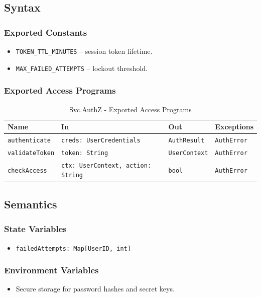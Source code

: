 \documentclass[12pt, titlepage]{article}
\begin{document}
\subsection{Syntax}

\subsubsection{Exported Constants}
\begin{itemize}
    \item \texttt{TOKEN\_TTL\_MINUTES} – session token lifetime.
    \item \texttt{MAX\_FAILED\_ATTEMPTS} – lockout threshold.
\end{itemize}

\subsubsection{Exported Access Programs}

\begin{table}[H]
\centering
\small
\caption{Svc.AuthZ - Exported Access Programs}
\begin{tabular}{p{3.2cm} p{3.8cm} p{3cm} p{4cm}}
\toprule
\textbf{Name} & \textbf{In} & \textbf{Out} & \textbf{Exceptions} \\
\midrule
\texttt{authenticate} & \texttt{creds: UserCredentials} & \texttt{AuthResult} & \texttt{AuthError} \\
\texttt{validateToken} & \texttt{token: String} & \texttt{UserContext} & \texttt{AuthError} \\
\texttt{checkAccess} & \texttt{ctx: UserContext, action: String} & \texttt{bool} & \texttt{AuthError} \\
\bottomrule
\end{tabular}
\end{table}

\subsection{Semantics}

\subsubsection{State Variables}
\begin{itemize}
    \item \texttt{failedAttempts: Map[UserID, int]}
\end{itemize}

\subsubsection{Environment Variables}
\begin{itemize}
    \item Secure storage for password hashes and secret keys.
\end{itemize}
\end{document}
